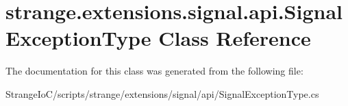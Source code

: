 \hypertarget{classstrange_1_1extensions_1_1signal_1_1api_1_1_signal_exception_type}{\section{strange.\-extensions.\-signal.\-api.\-Signal\-Exception\-Type Class Reference}
\label{classstrange_1_1extensions_1_1signal_1_1api_1_1_signal_exception_type}
}


The documentation for this class was generated from the following file\-:\begin{DoxyCompactItemize}
\item 
Strange\-Io\-C/scripts/strange/extensions/signal/api/Signal\-Exception\-Type.\-cs\end{DoxyCompactItemize}
